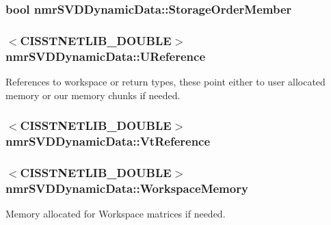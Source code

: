 \subsubsection[{Storage\+Order\+Member}]{\setlength{\rightskip}{0pt plus 5cm}bool nmr\+S\+V\+D\+Dynamic\+Data\+::\+Storage\+Order\+Member\hspace{0.3cm}{\ttfamily [protected]}}\label{classnmr_s_v_d_dynamic_data_ad8bf7fcd150c906b3f7407b5a91fa51b}
\hypertarget{classnmr_s_v_d_dynamic_data_a2f627a078f4bb1bc05c54f2e3269ae2c}{}
\subsubsection[{U\+Reference}]{$<$C\+I\+S\+S\+T\+N\+E\+T\+L\+I\+B\+\_\+\+D\+O\+U\+B\+L\+E$>$ nmr\+S\+V\+D\+Dynamic\+Data\+::\+U\+Reference\hspace{0.3cm}{\ttfamily [protected]}}\label{classnmr_s_v_d_dynamic_data_a2f627a078f4bb1bc05c54f2e3269ae2c}
References to workspace or return types, these point either to user allocated memory or our memory chunks if needed. \hypertarget{classnmr_s_v_d_dynamic_data_a55d8b13fe84f67743291578ce94578b0}{}
\subsubsection[{Vt\+Reference}]{$<$C\+I\+S\+S\+T\+N\+E\+T\+L\+I\+B\+\_\+\+D\+O\+U\+B\+L\+E$>$ nmr\+S\+V\+D\+Dynamic\+Data\+::\+Vt\+Reference\hspace{0.3cm}{\ttfamily [protected]}}\label{classnmr_s_v_d_dynamic_data_a55d8b13fe84f67743291578ce94578b0}
\hypertarget{classnmr_s_v_d_dynamic_data_abe50251589c5f7d24ae6d2024f7344f0}{}
\subsubsection[{Workspace\+Memory}]{$<$C\+I\+S\+S\+T\+N\+E\+T\+L\+I\+B\+\_\+\+D\+O\+U\+B\+L\+E$>$ nmr\+S\+V\+D\+Dynamic\+Data\+::\+Workspace\+Memory\hspace{0.3cm}{\ttfamily [protected]}}\label{classnmr_s_v_d_dynamic_data_abe50251589c5f7d24ae6d2024f7344f0}
Memory allocated for Workspace matrices if needed. \hypertarget{classnmr_s_v_d_dynamic_data_a616c1ec08f23128458db53bbfb1fa0b2}{}
